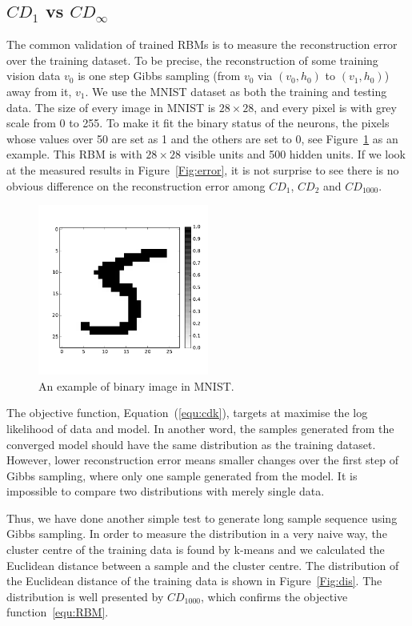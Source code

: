 \documentclass[11pt,twoside,a4paper]{article}
\begin{document}
\subsection{$CD_1$ vs $CD_{\infty}$}
\label{sec:cd1}
The common validation of trained RBMs is to measure the reconstruction error over the training dataset.
To be precise, the reconstruction of some training vision data $ v_0 $ is one step Gibbs sampling (from $ v_0 $ via $ (v_0, h_0 )$ to $ (v_1, h_0 )$) away from it, $ v_1 $.
We use the MNIST dataset as both the training and testing data.
The size of every image in MNIST is $28 \times 28$, and every pixel is with grey scale from 0 to 255.
To make it fit the binary status of the neurons, the pixels whose values over 50 are set as 1 and the others are set to 0, see Figure~\ref{Fig:5} as an example.
This RBM is with $28 \times 28$ visible units and 500 hidden units.
If we look at the measured results in Figure~\ref{Fig:error}, it is not surprise to see there is no obvious difference on the reconstruction error among $CD_1$, $CD_2$ and $CD_{1000}$.

	\begin{figure}[hbt]
		\centering
		\includegraphics[width=0.5\textwidth]{img/test.pdf}
		\caption{An example of binary image in MNIST.}
		\label{Fig:5}
	\end{figure}

The objective function, Equation~(\ref{equ:cdk}), targets at maximise the log likelihood of data and model.
In another word, the samples generated from the converged model should have the same distribution as the training dataset.
However, lower reconstruction error means smaller changes over the first step of Gibbs sampling, where only one sample generated from the model.
It is impossible to compare two distributions with merely single data.

Thus, we have done another simple test to generate long sample sequence using Gibbs sampling.
In order to measure the distribution in a very naive way, the cluster centre of the training data is found by k-means and we calculated the Euclidean distance between a sample and the cluster centre.
The distribution of the Euclidean distance of the training data is shown in Figure~\ref{Fig:dis}.
The distribution is well presented by $CD_{1000}$, which confirms the objective function~\ref{equ:RBM}.
\end{document}
